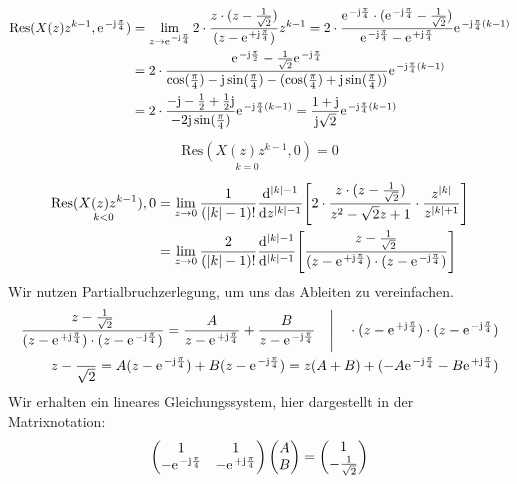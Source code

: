 \begin{align}
	\mathrm{Res}(X(z)z^{k-1},\e^{-\im\frac{\pi}{4}})&=\lim\limits_{z\rightarrow\e^{-\im\frac{\pi}{4}}}2\cdot\frac{z\cdot(z-\frac{1}{\sqrt{2}})}{(z-\e^{+\im\frac{\pi}{4}})}z^{k-1}=2\cdot\frac{\e^{-\im\frac{\pi}{4}}\cdot(\e^{-\im\frac{\pi}{4}}-\frac{1}{\sqrt{2}})}{\e^{-\im\frac{\pi}{4}}-\e^{+\im\frac{\pi}{4}}}\e^{-\im\frac{\pi}{4}(k-1)} \nonumber \\
	&=2\cdot\frac{\e^{-\im\frac{\pi}{2}}-\frac{1}{\sqrt{2}}\e^{-\im\frac{\pi}{4}}}{\cos(\frac{\pi}{4})-\im\sin(\frac{\pi}{4})-(\cos(\frac{\pi}{4})+\im\sin(\frac{\pi}{4}))}\e^{-\im\frac{\pi}{4}(k-1)}\nonumber\\
	&=2\cdot\frac{-\im-\frac{1}{2}+\frac{1}{2}\im}{-2\im\sin(\frac{\pi}{4})}\e^{-\im\frac{\pi}{4}(k-1)}=\frac{1+\im}{\im\sqrt{2}}\e^{-\im\frac{\pi}{4}(k-1)}
\end{align}
\begin{align}
	\underset{k=0}{\mathrm{Res}(X(z)z^{k-1},0)}=0
\end{align}
\begin{align}
	\underset{k<0}{\mathrm{Res}(X(z)z^{k-1}),0}&=\lim\limits_{z\rightarrow0}\frac{1}{(|k|-1)!}\frac{\mathrm{d}^{|k|-1}}{\mathrm{d}z^{|k|-1}}\Bigg [2\cdot\frac{z\cdot(z-\frac{1}{\sqrt{2}})}{z^2-\sqrt{2}z+1}\cdot\frac{z^{|k|}}{z^{|k|+1}}\Bigg]\nonumber\\
	&=\lim\limits_{z\rightarrow0}\frac{2}{(|k|-1)!}\frac{\mathrm{d}^{|k|-1}}{\mathrm{d}^{|k|-1}}\Bigg [\frac{z-\frac{1}{\sqrt{2}}}{(z-\e^{+\im\frac{\pi}{4}})\cdot(z-\e^{-\im\frac{\pi}{4}})}\Bigg]
\end{align}
Wir nutzen Partialbruchzerlegung, um uns das Ableiten zu vereinfachen.
\begin{align}
	\frac{z-\frac{1}{\sqrt{2}}}{(z-\e^{+\im\frac{\pi}{4}})\cdot(z-\e^{-\im\frac{\pi}{4}})}=\frac{A}{z-\e^{+\im\frac{\pi}{4}}}+\frac{B}{z-\e^{-\im\frac{\pi}{4}}}\quad\Bigg | \quad \cdot(z-\e^{+\im\frac{\pi}{4}})\cdot(z-\e^{-\im\frac{\pi}{4}}) \nonumber\\
	z-\frac{}{\sqrt{2}}=A(z-\e^{-\im\frac{\pi}{4}})+B(z-\e^{-\im\frac{\pi}{4}})=z(A+B)+(-A\e^{-\im\frac{\pi}{4}}-B\e^{+\im\frac{\pi}{4}})
\end{align}
Wir erhalten ein lineares Gleichungssystem, hier dargestellt in der Matrixnotation:
\begin{align}
	\begin{pmatrix}
		1 & 1 \\
		-\e^{-\im\frac{\pi}{4}} & -\e^{+\im\frac{\pi}{4}}
	\end{pmatrix}
	\begin{pmatrix}
		A \\
		B
	\end{pmatrix}
	=
	\begin{pmatrix}
		1 \\
		-\frac{1}{\sqrt{2}}
	\end{pmatrix}
\end{align}
